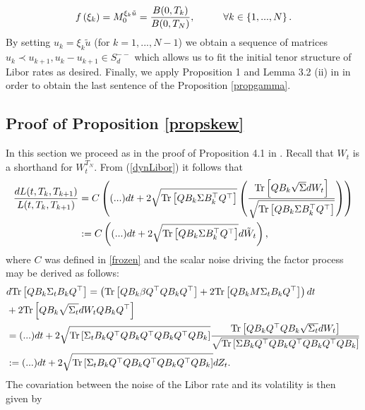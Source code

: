 \begin{equation}
f\left(\xi_{k}\right)=M_{0}^{\xi_{k}\tilde{u}}=\frac{B(0,T_{k})}{B(0,T_{N})}, \hspace{10mm}\forall k \in \left\{ 1,...,N\right\}.
\nonumber\end{equation}
By setting $u_{k}=\xi_{k}\tilde{u}$ (for $k=1,...,N-1$) we obtain a sequence of matrices $u_{k}\prec u_{k+1}, u_{k}-u_{k+1}\in S_d^{--}$ which allows us to fit the initial tenor structure of Libor rates as desired.
Finally, we apply Proposition 1 and Lemma 3.2 (ii) in \cite{article_Cuchiero} in order to obtain the last sentence of the Proposition \ref{propgamma}.
\endproof






\subsection*{Proof of Proposition \ref{propskew}}
In this section we proceed as in the proof of Proposition 4.1 in \cite{article_DaFonseca1}. Recall that $W_t$ is a shorthand for $W_t^{T_N}$. From (\ref{dynLibor}) it follows that
\begin{align}
\frac{dL(t,T_k,T_{k+1})}{L(t,T_k,T_{k+1})}&=C\left((...)dt+2\sqrt{\textup{Tr}\left[QB_k\Sigma B_k^{\top}Q^{\top}\right]}\left(\frac{\textup{Tr}\left[QB_k\sqrt{\Sigma}dW_t\right]}{\sqrt{\textup{Tr}\left[QB_k\Sigma B_k^{\top}Q^{\top}\right]}}\right)\right)\nonumber\\
&:=C\left((...)dt+2\sqrt{\textup{Tr}\left[QB_k\Sigma B_k^{\top}Q^{\top}\right]}d\tilde{W}_t\right),
\end{align}
where $C$ was defined in \eqref{frozen} and the scalar noise driving the factor process may be derived as follows:
\begin{align}
&d\textup{Tr}\left[QB_k\Sigma_t B_kQ^{\top}\right]=\left(\textup{Tr}\left[QB_k\beta Q^{\top}QB_kQ^{\top}\right]+2\textup{Tr}\left[QB_kM\Sigma_t B_kQ^{\top}\right]\right)dt\nonumber\\
&+2\textup{Tr}\left[QB_k\sqrt{\Sigma_t}dW_tQB_kQ^{\top}\right]\nonumber\\
&=(...)dt+2\sqrt{\textup{Tr}\left[\Sigma_t B_kQ^{\top}QB_kQ^{\top}QB_kQ^{\top}QB_k\right]}\frac{\textup{Tr}\left[QB_kQ^{\top}QB_k\sqrt{\Sigma_t}dW_t\right]}{\sqrt{\textup{Tr}\left[\Sigma B_kQ^{\top}QB_kQ^{\top}QB_kQ^{\top}QB_k \right]}}\nonumber\\
&:=(...)dt+2\sqrt{\textup{Tr}\left[\Sigma_t B_kQ^{\top}QB_kQ^{\top}QB_kQ^{\top}QB_k\right]}dZ_t.
\end{align}
The covariation between the noise of the Libor rate and its volatility is then given by
